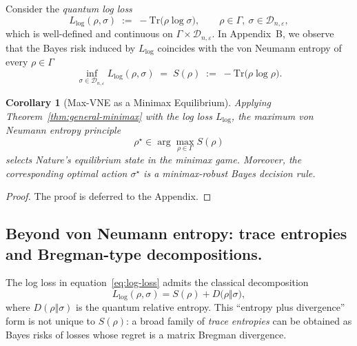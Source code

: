 \documentclass{article}
\newtheorem{corollary}{Corollary}
\theoremstyle{plain}
\theoremstyle{definition}
\def\eqref#1{equation~\ref{#1}}
\begin{document}
Consider the \emph{quantum log loss}
\begin{equation}
L_{\log}(\rho,\sigma)
\;:=\;
-\mathrm{Tr}\bigl(\rho \log \sigma\bigr),
\qquad
\rho\in\Gamma,\ \sigma\in\mathcal{D}_{n,\varepsilon},
\label{eq:log-loss}
\end{equation}
which is well-defined and continuous on $\Gamma\times\mathcal{D}_{n,\varepsilon}$. In Appendix~B, we observe that the Bayes risk induced by
$L_{\log}$ coincides with the von Neumann entropy of every $\rho\in\Gamma$
\begin{equation}
\inf_{\sigma \in \mathcal{D}_{n,\varepsilon}} L_{\log}(\rho,\sigma)
\;=\;
S(\rho)
\;:=\;
-\mathrm{Tr}\bigl(\rho \log \rho\bigr).
\label{eq:vne-bayes}
\end{equation}

\begin{corollary}[Max-VNE as a Minimax Equilibrium]
\label{cor:maxvne}
Applying Theorem~\ref{thm:general-minimax} with the log loss $L_{\log}$, the
maximum von Neumann entropy principle
\begin{equation}
\rho^\star \in \arg\max_{\rho \in \Gamma} S(\rho)
\end{equation}
selects Nature's equilibrium state in the minimax game. Moreover, the
corresponding optimal action $\sigma^\star$ is a minimax-robust Bayes decision rule.
\end{corollary}

\begin{proof}
The proof is deferred to the Appendix.
\end{proof}

\subsection{Beyond von Neumann entropy: trace entropies and Bregman-type decompositions.}
The log loss in \eqref{eq:log-loss} admits the classical decomposition
\begin{equation}
L_{\log}(\rho,\sigma)=S(\rho)+D\bigl(\rho\Vert\sigma\bigr),
\label{eq:logloss-decomp-main}
\end{equation}
where $D(\rho\Vert\sigma)$ is the quantum relative entropy. This ``entropy plus divergence''
form is not unique to $S(\rho)$: a broad family of \emph{trace entropies}
can be obtained as Bayes risks of losses whose regret is a matrix Bregman divergence.
\end{document}
